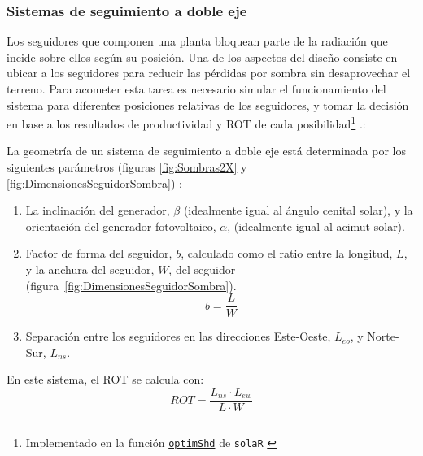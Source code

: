 \subsubsection{Sistemas de seguimiento a doble eje}

Los seguidores que componen una planta bloquean parte de la radiación
que incide sobre ellos según su posición. Una de los aspectos del
diseño consiste en ubicar a los seguidores para reducir las pérdidas
por sombra sin desaprovechar el terreno. Para acometer esta tarea
es necesario simular el funcionamiento del sistema para diferentes
posiciones relativas de los seguidores, y tomar la decisión en base
a los resultados de productividad y ROT de cada
posibilidad\footnote{Implementado en la función \href{http://search.r-project.org/R/library/solaR/html/optimShd.html}{\texttt{optimShd}} de
  \texttt{solaR} \cite{Perpinan2012b}} \citep{Perpinan2008}.:

La geometría de un sistema de seguimiento a doble eje está determinada
por los siguientes parámetros (figuras \ref{fig:Sombras2X} y \ref{fig:DimensionesSeguidorSombra})
: 
\begin{enumerate}
\item La inclinación del generador, $\beta$ (idealmente igual al ángulo
cenital solar), y la orientación del generador fotovoltaico, $\alpha$,
(idealmente igual al acimut solar).
\item Factor de forma del seguidor, $b$,
calculado como el ratio entre la longitud, $L$, y la anchura del
seguidor, $W$,
del seguidor (figura~\ref{fig:DimensionesSeguidorSombra}).
\begin{equation}
b=\frac{L}{W}
\end{equation}

\item Separación entre los seguidores en las direcciones Este-Oeste, 
$L_{eo}$,
y Norte-Sur, $L_{ns}$. 
\end{enumerate}
%
En este sistema, el ROT se calcula con:
\begin{equation}
  \label{eq:ROT2x}
  ROT=\frac{L_{ns} \cdot L_{ew}}{L \cdot W}
\end{equation}

